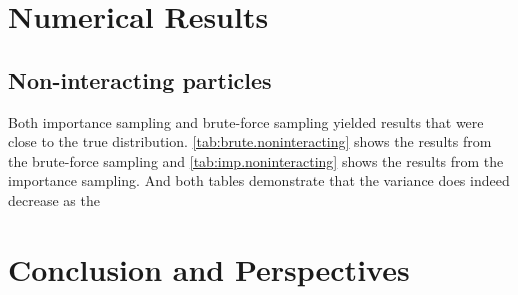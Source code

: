 \documentclass[11pt,a4paper]{article}
\numberwithin{equation}{section}
\begin{document}
\section{Numerical Results}
\subsection{Non-interacting particles}
Both importance sampling and brute-force sampling yielded results that were close to the true distribution. \cref{tab:brute.noninteracting} shows the results from the brute-force sampling and \cref{tab:imp.noninteracting} shows the results from the importance sampling. And both tables demonstrate that the variance does indeed decrease as the 


\section{Conclusion and Perspectives}





\pagebreak


\end{document}
